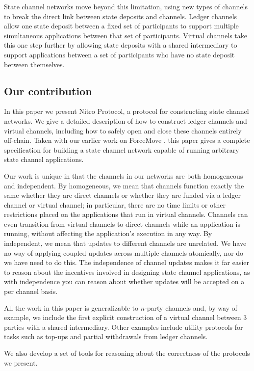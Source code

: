 State channel networks move beyond this limitation, using new types of channels to break the direct link between state deposits and channels.
Ledger channels allow one state deposit between a fixed set of participants to support multiple simultaneous applications between that set of participants.
Virtual channels take this one step further by allowing state deposits with a shared intermediary to support applications between a set of participants who have no state deposit between themselves.

\subsection{Our contribution}

In this paper we present Nitro Protocol, a protocol for constructing state channel networks.
We give a detailed description of how to construct ledger channels and virtual channels, including how to safely open and close these channels entirely off-chain.
Taken with our earlier work on ForceMove \cite{force-move}, this paper gives a complete specification for building a state channel network capable of running arbitrary state channel applications.

Our work is unique in that the channels in our networks are both homogeneous and independent.
By homogeneous, we mean that channels function exactly the same whether they are direct channels or whether they are funded via a ledger channel or virtual channel;
in particular, there are no time limits or other restrictions placed on the applications that run in virtual channels.
Channels can even transition from virtual channels to direct channels while an application is running, without affecting the application's execution in any way.
By independent, we mean that updates to different channels are unrelated.
We have no way of applying coupled updates across multiple channels atomically, nor do we have need to do this.
The independence of channel updates makes it far easier to reason about the incentives involved in designing state channel applications, as with independence you can reason about whether updates will be accepted on a per channel basis.

All the work in this paper is generalizable to $n$-party channels and, by way of example, we include the first explicit construction of a virtual channel between 3 parties with a shared intermediary.
Other examples include utility protocols for tasks such as top-ups and partial withdrawals from ledger channels.

We also develop a set of tools for reasoning about the correctness of the protocols we present.
















